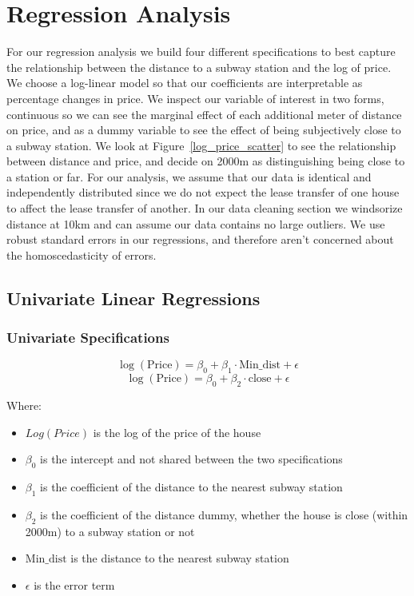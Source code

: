\section{Regression Analysis}
\label{sec:regression_analysis}

For our regression analysis we build four different specifications to best capture the 
relationship between the distance to a subway station and the log of price. We choose a log-linear model so that our coefficients
are interpretable as percentage changes in price. We inspect our variable of interest in two forms, continuous so we can 
see the marginal effect of each additional meter of distance on price, and as a dummy variable to see the effect of being subjectively close to a subway station.
We look at Figure~\ref{log_price_scatter} to see the relationship between distance and price, and decide on 2000m as distinguishing being close to a station or far.
For our analysis, we assume that our data is identical and independently distributed since we do not expect the lease transfer of one house to affect the lease transfer of another.
In our data cleaning section we windsorize distance at 10km and can assume our data contains no large outliers.
We use robust standard errors in our regressions, and therefore aren't concerned about the homoscedasticity of errors.

\subsection{Univariate Linear Regressions}
\subsubsection{Univariate Specifications}
\begin{equation}
   \log(\text{Price}) =\beta_0 + \beta_1 \cdot \text{Min\_dist}+\epsilon
      \label{eq:univariate_linear_regression}
\end{equation}
\begin{equation}
   \log(\text{Price}) =\beta_0+\beta_2 \cdot \text{close}+\epsilon
   \label{eq:dummy_univariate_linear_regression}
\end{equation}

Where:
\begin{itemize}
   \setlength{\itemsep}{0pt}%
   \setlength{\parskip}{0pt}%
   \setlength{\parsep}{0pt}%
      \item $Log(Price)$ is the log of the price of the house
      \item $\beta_0$ is the intercept and not shared between the two specifications
      \item $\beta_1$ is the coefficient of the distance to the nearest subway station
      \item $\beta_2$ is the coefficient of the distance dummy, whether the house is close (within 2000m) to a subway station or not
      \item $\text{Min\_dist}$ is the distance to the nearest subway station
      \item $\epsilon$ is the error term
   \end{itemize}

